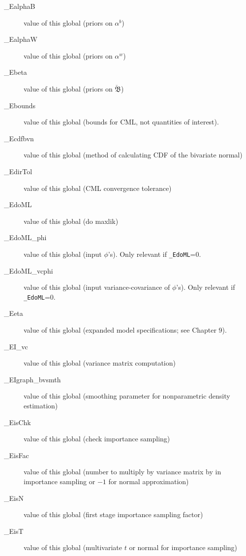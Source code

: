 \documentclass[11pt,titlepage]{article}
\newcommand{\bbetau}{\breve{\mathfrak B}}
\begin{document}
\begin{description}
\item[\_EalphaB] value of this global (priors on $\alpha^b$)

\item[\_EalphaW] value of this global (priors on $\alpha^w$)

\item[\_Ebeta] value of this global (priors on $\bbetau$)

\item[\_Ebounds] value of this global (bounds for CML, not quantities
  of interest).

\item[\_Ecdfbvn] value of this global (method of calculating CDF of
  the bivariate normal)

\item[\_EdirTol] value of this global (CML convergence tolerance)

\item[\_EdoML] value of this global (do maxlik)

\item[\_EdoML\_phi] value of this global (input $\phi$'s).  Only
  relevant if \texttt{\_EdoML}=0.

\item[\_EdoML\_vcphi] value of this global (input variance-covariance
  of $\phi$'s).  Only relevant if \texttt{\_EdoML}=0.

\item[\_Eeta] value of this global (expanded model specifications; see
  Chapter 9).

\item[\_EI\_vc] value of this global (variance matrix computation)

\item[\_EIgraph\_bvsmth] value of this global (smoothing parameter for
  nonparametric density estimation)

\item[\_EisChk] value of this global (check importance sampling)

\item[\_EisFac] value of this global (number to multiply by variance
  matrix by in importance sampling or $-1$ for normal approximation)

\item[\_EisN] value of this global (first stage importance sampling
  factor)

\item[\_EisT] value of this global (multivariate $t$ or normal for
  importance sampling)


\end{description}
\end{document}
